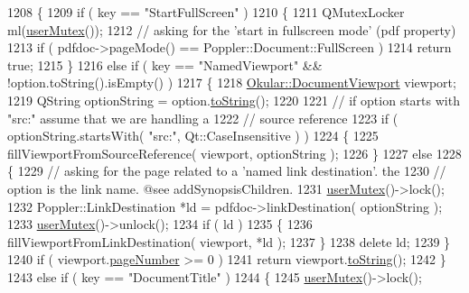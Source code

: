 \begin{DoxyCode}
1208 \{
1209     \textcolor{keywordflow}{if} ( key == \textcolor{stringliteral}{"StartFullScreen"} )
1210     \{
1211         QMutexLocker ml(\hyperlink{classOkular_1_1Generator_a83d702cccbce2288c3258d97f1f15e19}{userMutex}());
1212         \textcolor{comment}{// asking for the 'start in fullscreen mode' (pdf property)}
1213         \textcolor{keywordflow}{if} ( pdfdoc->pageMode() == Poppler::Document::FullScreen )
1214             \textcolor{keywordflow}{return} \textcolor{keyword}{true};
1215     \}
1216     \textcolor{keywordflow}{else} \textcolor{keywordflow}{if} ( key == \textcolor{stringliteral}{"NamedViewport"} && !option.toString().isEmpty() )
1217     \{
1218         \hyperlink{classOkular_1_1DocumentViewport}{Okular::DocumentViewport} viewport;
1219         QString optionString = option.\hyperlink{classOkular_1_1DocumentViewport_a77e42e0c9502b91085cd25f845ecafa0}{toString}();
1220 
1221         \textcolor{comment}{// if option starts with "src:" assume that we are handling a}
1222         \textcolor{comment}{// source reference}
1223         \textcolor{keywordflow}{if} ( optionString.startsWith( \textcolor{stringliteral}{"src:"}, Qt::CaseInsensitive ) )
1224         \{
1225             fillViewportFromSourceReference( viewport, optionString );
1226         \}
1227         \textcolor{keywordflow}{else}
1228         \{
1229             \textcolor{comment}{// asking for the page related to a 'named link destination'. the}
1230             \textcolor{comment}{// option is the link name. @see addSynopsisChildren.}
1231             \hyperlink{classOkular_1_1Generator_a83d702cccbce2288c3258d97f1f15e19}{userMutex}()->lock();
1232             Poppler::LinkDestination *ld = pdfdoc->linkDestination( optionString );
1233             \hyperlink{classOkular_1_1Generator_a83d702cccbce2288c3258d97f1f15e19}{userMutex}()->unlock();
1234             \textcolor{keywordflow}{if} ( ld )
1235             \{
1236                 fillViewportFromLinkDestination( viewport, *ld );
1237             \}
1238             \textcolor{keyword}{delete} ld;
1239         \}
1240         \textcolor{keywordflow}{if} ( viewport.\hyperlink{classOkular_1_1DocumentViewport_a122674d4a493e79b1aa5fd5c00e81c93}{pageNumber} >= 0 )
1241             \textcolor{keywordflow}{return} viewport.\hyperlink{classOkular_1_1DocumentViewport_a77e42e0c9502b91085cd25f845ecafa0}{toString}();
1242     \}
1243     \textcolor{keywordflow}{else} \textcolor{keywordflow}{if} ( key == \textcolor{stringliteral}{"DocumentTitle"} )
1244     \{
1245         \hyperlink{classOkular_1_1Generator_a83d702cccbce2288c3258d97f1f15e19}{userMutex}()->lock();

\end{DoxyCode}
